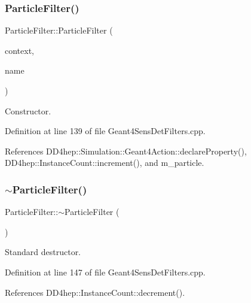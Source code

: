 \subsubsection{\texorpdfstring{Particle\+Filter()}{ParticleFilter()}}
{\footnotesize\ttfamily Particle\+Filter\+::\+Particle\+Filter (\begin{DoxyParamCaption}\item[{\hyperlink{class_d_d4hep_1_1_simulation_1_1_geant4_context}{Geant4\+Context} $\ast$}]{context,  }\item[{const std\+::string \&}]{name }\end{DoxyParamCaption})}



Constructor. 



Definition at line 139 of file Geant4\+Sens\+Det\+Filters.\+cpp.



References D\+D4hep\+::\+Simulation\+::\+Geant4\+Action\+::declare\+Property(), D\+D4hep\+::\+Instance\+Count\+::increment(), and m\+\_\+particle.

\hypertarget{struct_d_d4hep_1_1_simulation_1_1_particle_filter_a4f4ccdfa224f0a62c411230f7fb0cd65}{}\label{struct_d_d4hep_1_1_simulation_1_1_particle_filter_a4f4ccdfa224f0a62c411230f7fb0cd65} 
\subsubsection{\texorpdfstring{$\sim$\+Particle\+Filter()}{~ParticleFilter()}}
{\footnotesize\ttfamily Particle\+Filter\+::$\sim$\+Particle\+Filter (\begin{DoxyParamCaption}{ }\end{DoxyParamCaption})\hspace{0.3cm}{\ttfamily [virtual]}}



Standard destructor. 



Definition at line 147 of file Geant4\+Sens\+Det\+Filters.\+cpp.



References D\+D4hep\+::\+Instance\+Count\+::decrement().



